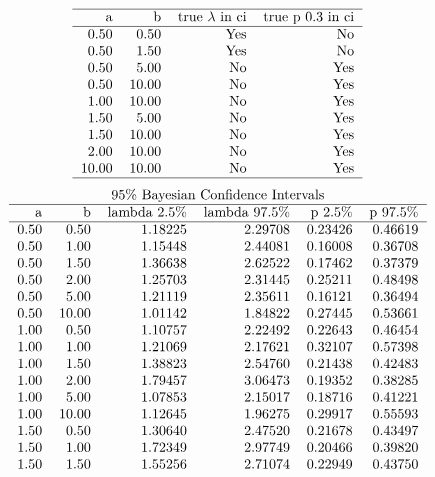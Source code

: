 \documentclass[12pt]{article}
\begin{document}
\begin{description}
\begin{description}
\[\begin{tabular}{rrrr}
  \hline
a & b & true $\lambda$ in ci & true p 0.3 in ci \\ 
  \hline
0.50 & 0.50 & Yes & No \\ 
  0.50 & 1.50 & Yes & No \\ 
  0.50 & 5.00 & No & Yes \\ 
  0.50 & 10.00 & No & Yes \\ 
  1.00 & 10.00 & No & Yes \\ 
  1.50 & 5.00 & No & Yes \\ 
  1.50 & 10.00 & No & Yes \\ 
  2.00 & 10.00 & No & Yes \\ 
  10.00 & 10.00 & No & Yes \\ 
   \hline
\end{tabular}\]
\vspace{-5mm}
\[\begin{tabular}{rrrrrr}
\multicolumn{6}{c}{95\% Bayesian Confidence Intervals}\\
  \hline
a & b & lambda 2.5\% & lambda 97.5\% & p 2.5\% & p 97.5\% \\ 
  \hline
0.50 & 0.50 & 1.18225 & 2.29708 & 0.23426 & 0.46619 \\ 
  0.50 & 1.00 & 1.15448 & 2.44081 & 0.16008 & 0.36708 \\ 
  0.50 & 1.50 & 1.36638 & 2.62522 & 0.17462 & 0.37379 \\ 
  0.50 & 2.00 & 1.25703 & 2.31445 & 0.25211 & 0.48498 \\ 
  0.50 & 5.00 & 1.21119 & 2.35611 & 0.16121 & 0.36494 \\ 
  0.50 & 10.00 & 1.01142 & 1.84822 & 0.27445 & 0.53661 \\ 
  1.00 & 0.50 & 1.10757 & 2.22492 & 0.22643 & 0.46454 \\ 
  1.00 & 1.00 & 1.21069 & 2.17621 & 0.32107 & 0.57398 \\ 
  1.00 & 1.50 & 1.38823 & 2.54760 & 0.21438 & 0.42483 \\ 
  1.00 & 2.00 & 1.79457 & 3.06473 & 0.19352 & 0.38285 \\ 
  1.00 & 5.00 & 1.07853 & 2.15017 & 0.18716 & 0.41221 \\ 
  1.00 & 10.00 & 1.12645 & 1.96275 & 0.29917 & 0.55593 \\ 
  1.50 & 0.50 & 1.30640 & 2.47520 & 0.21678 & 0.43497 \\ 
  1.50 & 1.00 & 1.72349 & 2.97749 & 0.20466 & 0.39820 \\ 
  1.50 & 1.50 & 1.55256 & 2.71074 & 0.22949 & 0.43750 \\ 

\end{tabular}\]
\end{description}
\end{description}
\end{document}
